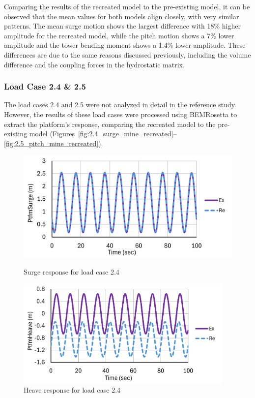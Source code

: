 \documentclass[a4paper, 11pt]{article}
\begin{document}
Comparing the results of the recreated model to the pre-existing model, it can be observed that the mean values for both models align closely, with very similar patterns. The mean surge motion shows the largest difference with 18\% higher amplitude for the recreated model, while the pitch motion shows a 7\% lower amplitude and the tower bending moment shows a 1.4\% lower amplitude. These differences are due to the same reasons discussed previously, including the volume difference and the coupling forces in the hydrostatic matrix.

\subsubsection{Load Case 2.4 \& 2.5}

\hspace*{0.5cm}The load cases 2.4 and 2.5 were not analyzed in detail in the reference study. However, the results of these load cases were processed using BEMRosetta to extract the platform's response, comparing the recreated model to the pre-existing model (Figures~\ref{fig:2.4_surge_mine_recreated}--\ref{fig:2.5_pitch_mine_recreated}).

\begin{figure}[H]
    \begin{minipage}{0.48\textwidth}
        \centering
        \includegraphics[width=1\textwidth]{2.4_surge_mine.png}
        \caption{\small Surge response for load case 2.4}
        \label{fig:2.4_surge_mine_recreated}
    \end{minipage}
    \hfill
    \begin{minipage}{0.5\textwidth}
        \centering
        \includegraphics[width=0.95\textwidth]{2.4_heave_mine.png}
        \caption{\small Heave response for load case 2.4}
        \label{fig:2.4_heave_mine_recreated}
    \end{minipage}
\end{figure}
\end{document}
